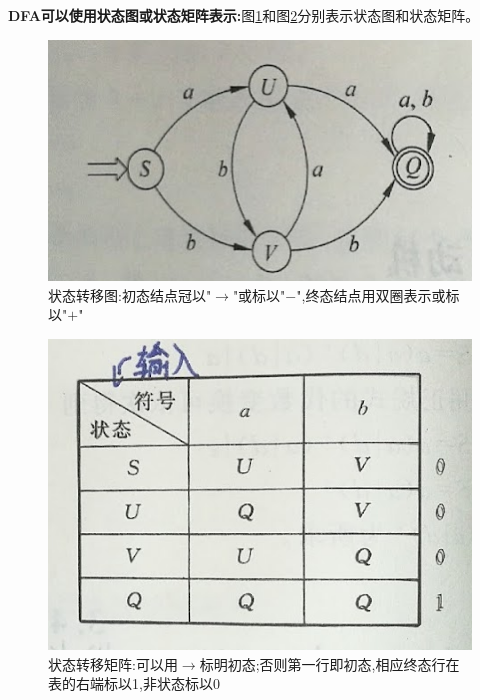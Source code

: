 \documentclass[UTF8,a4paper]{ctexart}
\begin{document}
  \textbf{DFA可以使用状态图或状态矩阵表示:}图\ref{fig1}和图\ref{fig2}分别表示状态图和状态矩阵。

  \begin{figure}[H]
    \centering
    \includegraphics[scale = 0.3]{assets/CompilerConstructionPrinciples_5398e.png}
    \caption{状态转移图:初态结点冠以"$\rightarrow$"或标以"$-$",终态结点用双圈表示或标以"$+$"}
    \label{fig1}
  \end{figure}

  \begin{figure}[H]
    \centering
    \includegraphics[scale = 0.3]{assets/CompilerConstructionPrinciples_c1ff8.png}
    \caption{状态转移矩阵:可以用$\rightarrow$标明初态;否则第一行即初态,相应终态行在表的右端标以1,非状态标以0}
    \label{fig2}
  \end{figure}
\end{document}
